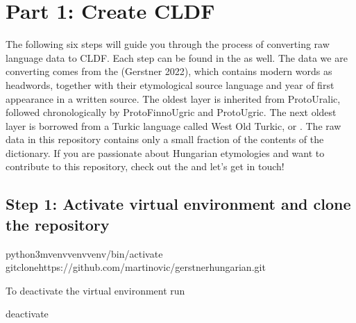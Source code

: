 \documentclass[letterpaper,10pt,english]{sphinxmanual}
\begin{document}
{{{{\chapter{Part 1: Create CLDF}
\label{\detokenize{mkcldf:part-1-create-cldf}}\label{\detokenize{mkcldf::doc}}
\sphinxAtStartPar
The following six steps will guide you through the process of
converting raw language data to CLDF. Each step can be found in the
as well. The data we are converting comes from
the  (Gerstner 2022),
which contains modern  words as headwords,
together with their
etymological source language and year of first appearance in a written source.
The oldest layer is inherited from Proto\sphinxhyphen{}Uralic, followed chronologically by
Proto\sphinxhyphen{}Finno\sphinxhyphen{}Ugric and
Proto\sphinxhyphen{}Ugric. The next oldest layer is borrowed from a Turkic language called
West Old Turkic, or . The raw data in this
repository contains
only a small fraction of the contents of the dictionary.
If you are passionate about Hungarian etymologies and want to contribute
to this repository, check out the 
and let’s get in touch!


\section{Step 1: Activate virtual environment and clone the repository}
\label{\detokenize{mkcldf:step-1-activate-virtual-environment-and-clone-the-repository}}
\begin{sphinxVerbatim}[commandchars=\\\{\}]
python3\PYGZhy{}mvenvvenvvenv/bin/activate
gitclonehttps://github.com/martino\PYGZhy{}vic/gerstnerhungarian.git
\end{sphinxVerbatim}

\sphinxAtStartPar
To deactivate the virtual environment run

\begin{sphinxVerbatim}[commandchars=\\\{\}]
deactivate
\end{sphinxVerbatim}

}}}}
\end{document}

